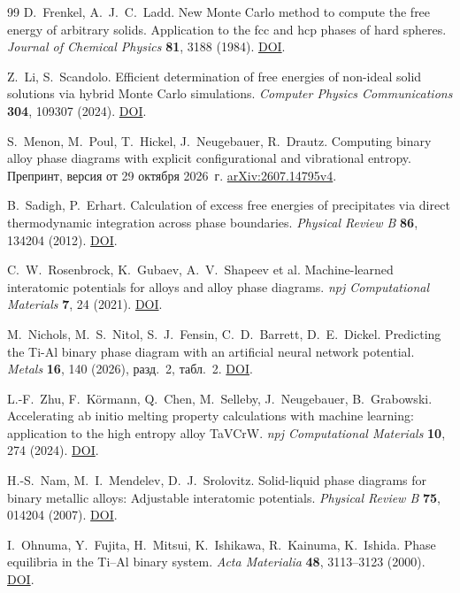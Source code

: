 \documentclass[11pt,a4paper]{article}
\begin{document}
\begin{thebibliography}{99}
D.~Frenkel, A.~J.~C.~Ladd.
New Monte Carlo method to compute the free energy of arbitrary solids.
Application to the fcc and hcp phases of hard spheres.
\emph{Journal of Chemical Physics} \textbf{81}, 3188 (1984).
\href{https://doi.org/10.1063/1.448024}{DOI}.

Z.~Li, S.~Scandolo.
Efficient determination of free energies of non-ideal solid solutions via hybrid
Monte Carlo simulations.
\emph{Computer Physics Communications} \textbf{304}, 109307 (2024).
\href{https://doi.org/10.1016/j.cpc.2024.109307}{DOI}.

S.~Menon, M.~Poul, T.~Hickel, J.~Neugebauer, R.~Drautz.
Computing binary alloy phase diagrams with explicit configurational and
vibrational entropy.
Препринт, версия от 29 октября 2026~г.
\href{https://arxiv.org/abs/2607.14795v4}{arXiv:2607.14795v4}.

B.~Sadigh, P.~Erhart.
Calculation of excess free energies of precipitates via direct thermodynamic
integration across phase boundaries.
\emph{Physical Review B} \textbf{86}, 134204 (2012).
\href{https://doi.org/10.1103/PhysRevB.86.134204}{DOI}.

C.~W.~Rosenbrock, K.~Gubaev, A.~V.~Shapeev et al.
Machine-learned interatomic potentials for alloys and alloy phase diagrams.
\emph{npj Computational Materials} \textbf{7}, 24 (2021).
\href{https://doi.org/10.1038/s41524-020-00477-2}{DOI}.

M.~Nichols, M.~S.~Nitol, S.~J.~Fensin, C.~D.~Barrett, D.~E.~Dickel.
Predicting the Ti-Al binary phase diagram with an artificial neural network potential.
\emph{Metals} \textbf{16}, 140 (2026), разд.~2, табл.~2.
\href{https://doi.org/10.3390/met16020140}{DOI}.

L.-F.~Zhu, F.~Körmann, Q.~Chen, M.~Selleby, J.~Neugebauer, B.~Grabowski.
Accelerating ab initio melting property calculations with machine learning:
application to the high entropy alloy TaVCrW.
\emph{npj Computational Materials} \textbf{10}, 274 (2024).
\href{https://doi.org/10.1038/s41524-024-01464-7}{DOI}.

H.-S.~Nam, M.~I.~Mendelev, D.~J.~Srolovitz.
Solid-liquid phase diagrams for binary metallic alloys: Adjustable interatomic potentials.
\emph{Physical Review B} \textbf{75}, 014204 (2007).
\href{https://doi.org/10.1103/PhysRevB.75.014204}{DOI}.

I.~Ohnuma, Y.~Fujita, H.~Mitsui, K.~Ishikawa, R.~Kainuma, K.~Ishida.
Phase equilibria in the Ti--Al binary system.
\emph{Acta Materialia} \textbf{48}, 3113--3123 (2000).
\href{https://doi.org/10.1016/S1359-6454(00)00118-X}{DOI}.

\end{thebibliography}
\end{document}
